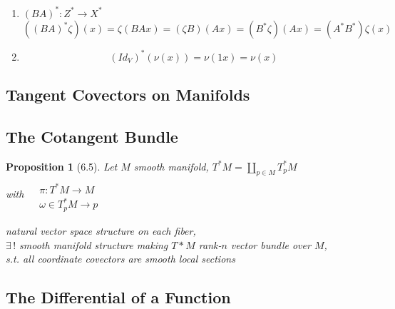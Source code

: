 \documentclass[11pt]{amsart}
\newtheorem{proposition}{Proposition}
\theoremstyle{definition}
\begin{document}
\begin{enumerate}
\item[(a)] 



$(BA)^* : Z^* \to X^*$
\[
((BA)^* \zeta)(x) = \zeta(BAx) = (\zeta B)(Ax) = (B^* \zeta)(Ax) = (A^* B^*)\zeta(x)
\]

\item[(b)]
\[
(Id_V)^*(\nu(x)) = \nu(1x) = \nu(x)
\]
\end{enumerate}

\subsection*{ Tangent Covectors on Manifolds}



\subsection*{ The Cotangent Bundle}

\begin{proposition}[6.5] Let $M$ smooth manifold, $T^*M = \coprod_{p \in M} T_p^*M$ \\
with $\begin{aligned} & \quad \\
  & \pi : T^*M \to M \\
  & \omega \in T^*_pM \to p \end{aligned}$

natural vector space structure on each fiber, \\
$\exists \, !$ smooth manifold structure making $T*M$ rank-$n$ vector bundle over $M$, \\
s.t. all coordinate covectors are smooth local sections
\end{proposition}

\subsection*{ The Differential of a Function }
\end{document}
